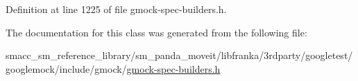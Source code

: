 Definition at line 1225 of file gmock-\/spec-\/builders.\+h.



The documentation for this class was generated from the following file\+:\begin{DoxyCompactItemize}
\item 
smacc\+\_\+sm\+\_\+reference\+\_\+library/sm\+\_\+panda\+\_\+moveit/libfranka/3rdparty/googletest/googlemock/include/gmock/\hyperlink{gmock-spec-builders_8h}{gmock-\/spec-\/builders.\+h}\end{DoxyCompactItemize}
